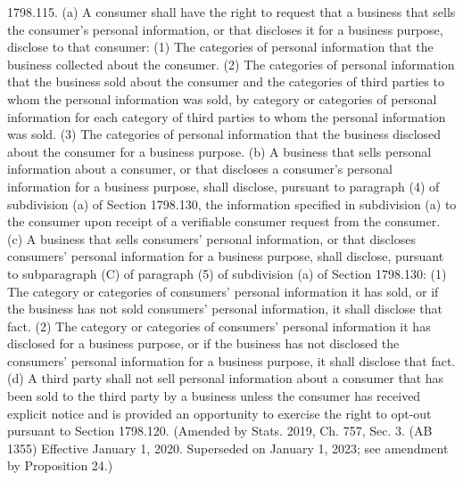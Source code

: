 1798.115.  (a) A consumer shall have the right to request that a business that sells the consumer’s personal information, or that discloses it for a business purpose, disclose to that consumer:
(1) The categories of personal information that the business collected about the consumer.
(2) The categories of personal information that the business sold about the consumer and the categories of third parties to whom the personal information was sold, by category or categories of personal information for each category of third parties to whom the personal information was sold.
(3) The categories of personal information that the business disclosed about the consumer for a business purpose.
(b) A business that sells personal information about a consumer, or that discloses a consumer’s personal information for a business purpose, shall disclose, pursuant to paragraph (4) of subdivision (a) of Section 1798.130, the information specified in subdivision (a) to the consumer upon receipt of a verifiable consumer request from the consumer.
(c) A business that sells consumers’ personal information, or that discloses consumers’ personal information for a business purpose, shall disclose, pursuant to subparagraph (C) of paragraph (5) of subdivision (a) of Section 1798.130:
(1) The category or categories of consumers’ personal information it has sold, or if the business has not sold consumers’ personal information, it shall disclose that fact.
(2) The category or categories of consumers’ personal information it has disclosed for a business purpose, or if the business has not disclosed the consumers’ personal information for a business purpose, it shall disclose that fact.
(d) A third party shall not sell personal information about a consumer that has been sold to the third party by a business unless the consumer has received explicit notice and is provided an opportunity to exercise the right to opt-out pursuant to Section 1798.120.
(Amended by Stats. 2019, Ch. 757, Sec. 3. (AB 1355) Effective January 1, 2020. Superseded on January 1, 2023; see amendment by Proposition 24.)

